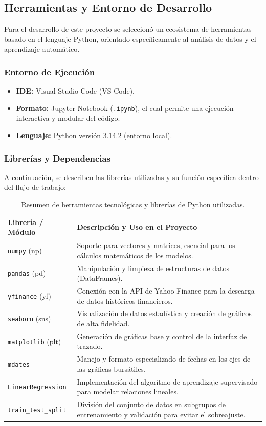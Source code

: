 \documentclass[12pt]{article}
\begin{document}
\subsection{Herramientas y Entorno de Desarrollo}

Para el desarrollo de este proyecto se seleccionó un ecosistema de herramientas basado en el lenguaje Python, orientado específicamente al análisis de datos y el aprendizaje automático.

\subsubsection{Entorno de Ejecución}
\begin{itemize}
    \item \textbf{IDE:} Visual Studio Code (VS Code).
    \item \textbf{Formato:} Jupyter Notebook (\texttt{.ipynb}), el cual permite una ejecución interactiva y modular del código.
    \item \textbf{Lenguaje:} Python versión 3.14.2 (entorno local).
\end{itemize}

\subsubsection{Librerías y Dependencias}
A continuación, se describen las librerías utilizadas y su función específica dentro del flujo de trabajo:

\begin{table}[H]
\renewcommand{\arraystretch}{1.5}
\centering
\begin{tabularx}{\textwidth}{|l|X|}
\hline
\rowcolor[HTML]{EFEFEF} 
\textbf{Librería / Módulo} & \textbf{Descripción y Uso en el Proyecto} \\ \hline
\texttt{numpy} (np) & Soporte para vectores y matrices, esencial para los cálculos matemáticos de los modelos. \\ \hline
\texttt{pandas} (pd) & Manipulación y limpieza de estructuras de datos (DataFrames). \\ \hline
\texttt{yfinance} (yf) & Conexión con la API de Yahoo Finance para la descarga de datos históricos financieros. \\ \hline
\texttt{seaborn} (sns) & Visualización de datos estadística y creación de gráficos de alta fidelidad. \\ \hline
\texttt{matplotlib} (plt) & Generación de gráficas base y control de la interfaz de trazado. \\ \hline
\texttt{mdates} & Manejo y formato especializado de fechas en los ejes de las gráficas bursátiles. \\ \hline
\texttt{LinearRegression} & Implementación del algoritmo de aprendizaje supervisado para modelar relaciones lineales. \\ \hline
\texttt{train\_test\_split} & División del conjunto de datos en subgrupos de entrenamiento y validación para evitar el sobreajuste. \\ \hline
\end{tabularx}
\caption{Resumen de herramientas tecnológicas y librerías de Python utilizadas.}
\end{table}
\end{document}
